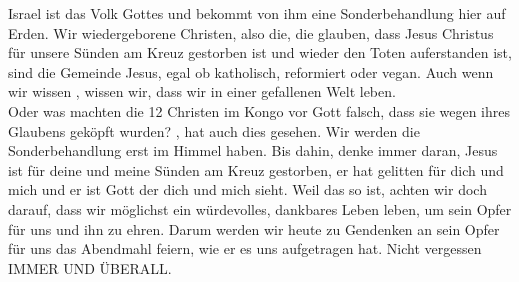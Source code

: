 Israel ist das Volk Gottes und bekommt von ihm eine Sonderbehandlung hier auf Erden. Wir wiedergeborene Christen, also die, die glauben, dass Jesus Christus für unsere Sünden am Kreuz gestorben ist und wieder den Toten auferstanden ist, sind die Gemeinde Jesus, egal ob katholisch, reformiert oder vegan. Auch wenn wir wissen , wissen wir, dass wir in einer gefallenen Welt leben.\\
Oder was machten die 12 Christen im Kongo vor Gott falsch, dass sie wegen ihres Glaubens geköpft wurden? , hat auch dies gesehen. Wir werden die Sonderbehandlung erst im Himmel haben. Bis dahin, denke immer daran, Jesus ist für deine und meine Sünden am Kreuz gestorben, er hat gelitten für dich und mich und er ist Gott der dich und mich sieht. Weil das so ist, achten wir doch darauf, dass wir möglichst ein würdevolles, dankbares Leben leben, um sein Opfer für uns und ihn zu ehren. Darum werden wir heute zu Gendenken an sein Opfer für uns das Abendmahl feiern, wie er es uns aufgetragen hat. Nicht vergessen  IMMER UND ÜBERALL.